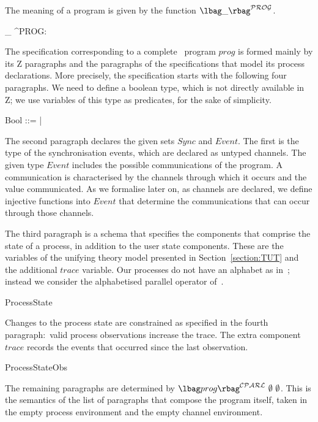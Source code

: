\documentclass{article}
\begin{document}
The meaning of a program is given by the function \mbox{$\lbag\_
  \rbag^{\cal PROG}$}.
\begin{zed}
  \lbag\_ \rbag^{\cal PROG}:  \pfun
\end{zed}
The specification corresponding to a complete \Circus\ program $prog$
is formed mainly by its Z paragraphs and the paragraphs of the
specifications that model its process declarations.  More precisely,
the specification starts with the following four paragraphs.  We need
to define a boolean type, which is not directly available in Z; we use
variables of this type as predicates, for the sake of simplicity.
\newcommand{\freetypeFalse}{\freetype{False}}
\newcommand{\freetypeTrue}{}
\begin{zed}
  Bool ::= \freetypeFalse | \freetypeTrue
\end{zed}
The second paragraph declares the given sets $Sync$ and $Event$.  The
first is the type of the synchronisation events, which are declared as
untyped channels.  The given type $Event$ includes the possible
communications of the program.  A communication is characterised by
the channels through which it occurs and the value communicated.  As
we formalise later on, as channels are declared, we define injective
functions into $Event$ that determine the communications that can
occur through those channels.
\begin{zed}
\end{zed}
The third paragraph is a schema that specifies the components that
comprise the state of a process, in addition to the user state
components.  These are the variables of the unifying theory model
presented in Section~\ref{section:TUT} and the additional $trace$
variable.  Our processes do not have an alphabet as in~\cite{HH98};
instead we consider the alphabetised parallel operator
of~\cite{Ros98}.
\begin{zed}
  ProcessState 
\end{zed}
Changes to the process state are constrained as specified in the
fourth paragraph:~valid process observations increase the trace.  The
extra component $trace$ records the events that occurred since the
last observation.
\begin{zed}
  ProcessStateObs 
\end{zed}
The remaining paragraphs are determined by $\lbag prog \rbag^{\cal
  CPARL}\ \emptyset\ \emptyset$.  This is the semantics of the list of
paragraphs that compose the program itself, taken in the empty process
environment and the empty channel environment.
\end{document}
